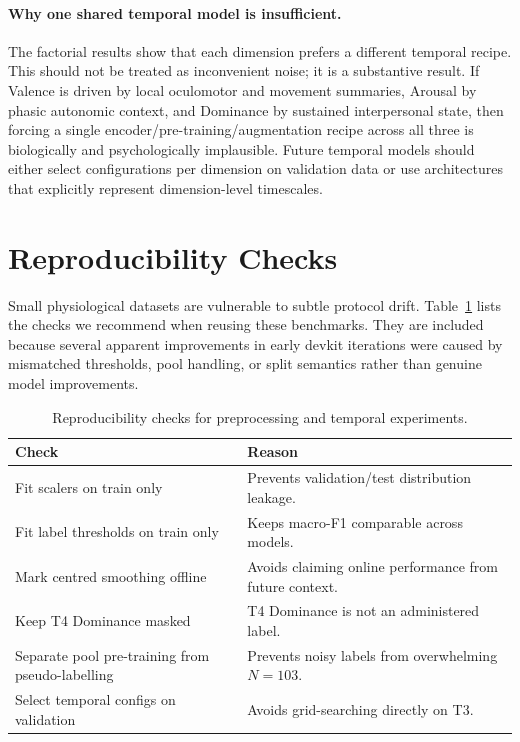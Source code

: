 \documentclass[sigconf,review,anonymous]{acmart}
\begin{document}
\paragraph{Why one shared temporal model is insufficient.}
The factorial results show that each dimension prefers a different temporal
recipe.
This should not be treated as inconvenient noise; it is a substantive result.
If Valence is driven by local oculomotor and movement summaries, Arousal by
phasic autonomic context, and Dominance by sustained interpersonal state, then
forcing a single encoder/pre-training/augmentation recipe across all three is
biologically and psychologically implausible.
Future temporal models should either select configurations per dimension on
validation data or use architectures that explicitly represent dimension-level
timescales.

\section{Reproducibility Checks}
\label{sec:checks}

Small physiological datasets are vulnerable to subtle protocol drift.
Table~\ref{tab:checks} lists the checks we recommend when reusing these
benchmarks.
They are included because several apparent improvements in early devkit
iterations were caused by mismatched thresholds, pool handling, or split
semantics rather than genuine model improvements.

\begin{table}[t]
\caption{Reproducibility checks for preprocessing and temporal experiments.}
\label{tab:checks}
\centering
\setlength{\tabcolsep}{2pt}
\small
\begin{tabular}{p{}p{}}
\toprule
\textbf{Check} & \textbf{Reason} \\
\midrule
Fit scalers on train only & Prevents validation/test distribution leakage. \\
Fit label thresholds on train only & Keeps macro-F1 comparable across models. \\
Mark centred smoothing offline & Avoids claiming online performance from future context. \\
Keep T4 Dominance masked & T4 Dominance is not an administered label. \\
Separate pool pre-training from pseudo-labelling & Prevents noisy labels from overwhelming $N=103$. \\
Select temporal configs on validation & Avoids grid-searching directly on T3. \\
\bottomrule
\end{tabular}
\end{table}
\end{document}
